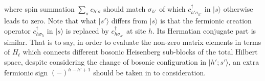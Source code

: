 \documentclass[eprint]{article} %
\begin{document}
where spin summation $\sum_{\sigma}c_{h{'\sigma}}$ should match $\sigma_{h{'}}$ of which $c_{h{'}\sigma_{h{'}}}^{\dagger}$ in $|s\rangle$ otherwise leads to zero. Note that what $|s{'}\rangle$ differs from $|s\rangle$ is that the fermionic creation operator $c_{h\sigma_{h}}^{\dagger}$ in $|s\rangle$ is replaced by $c_{h\sigma_{h{'}}}^{\dagger}$ at site $h$. Its Hermatian conjugate part is similar. That is to say, in order to evaluate the non-zero matrix elements in terms of $H_{t}$ which connects different bosonic Heisenberg sub-blocks of the total Hilbert space, despite considering the change of bosonic configuration in $|h{'}; s{'\rangle}$, an extra fermionic sign $(-)^{h-h{'}+1}$ should be taken in to consideration.

 

\end{document}

